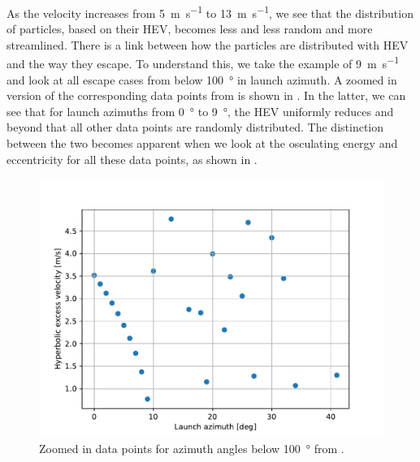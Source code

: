 \FloatBarrier
As the velocity increases from \SI{5}{\metre\per\second} to \SI{13}{\metre\per\second}, we see that the distribution of particles, based on their \gls{HEV}, becomes less and less random and more streamlined. There is a link between how the particles are distributed with \gls{HEV} and the way they escape. To understand this, we take the example of \SI{9}{\metre\per\second} and look at all escape cases from below \SI{100}{\degree} in launch azimuth. A zoomed in version of the corresponding data points from  is shown in . In the latter, we can see that for launch azimuths from \SI{0}{\degree} to \SI{9}{\degree}, the \gls{HEV} uniformly reduces and beyond that all other data points are randomly distributed. The distinction between the two becomes apparent when we look at the osculating energy and eccentricity for all these data points, as shown in .
\begin{figure}[htb]
\centering
\captionsetup{justification=centering}
\includegraphics[width=\textwidth, height=0.3\textheight, keepaspectratio=true]{Images/longest_edge_no_perturbations/escape_hev_9ms_lowerAzimuth.pdf}
\caption{Zoomed in data points for azimuth angles below \SI{100}{\degree} from \protect{}.}
\label{fig:hev_9ms_lowerAzimuths_noSP}
\end{figure}
\FloatBarrier
